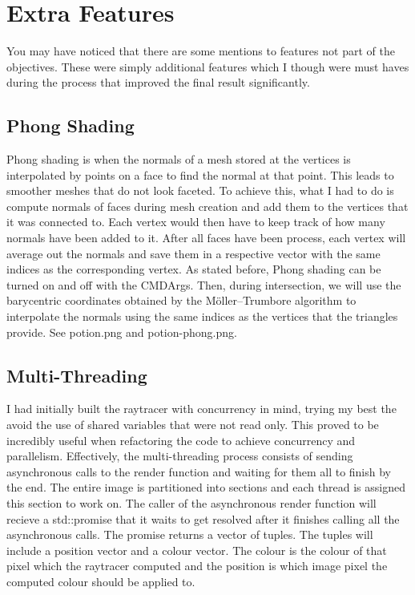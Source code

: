 \documentclass {article}
\begin{document}
\section{Extra Features}
You may have noticed that there are some mentions to features not part of the objectives. These 
were simply additional features which I though were must haves during the process that improved the
final result significantly.
\subsection{Phong Shading}
Phong shading is when the normals of a mesh stored at the vertices is interpolated by points on 
a face to find the normal at that point. This leads to smoother meshes that do not look faceted.
To achieve this, what I had to do is compute normals of faces during mesh creation and add them to 
the vertices that it was connected to. Each vertex would then have to keep track of how many normals have
been added to it. After all faces have been process, each vertex will average out the normals and 
save them in a respective vector with the same indices as the corresponding vertex.
 As stated before, Phong shading can be turned on
and off with the CMDArgs. Then, during intersection, we will use the barycentric coordinates obtained by
the Möller–Trumbore algorithm to interpolate the normals using the same indices as the vertices that the
triangles provide. See potion.png and potion-phong.png.
\subsection{Multi-Threading}
I had initially built the raytracer with concurrency in mind, trying my best the avoid 
the use of shared variables that were not read only. This proved to be incredibly useful 
when refactoring the code to achieve concurrency and parallelism. Effectively, the multi-threading process
consists of sending asynchronous calls to the render function and waiting for them all to finish
by the end. The entire image is partitioned into sections and each thread is assigned this section to work on.
The caller of the asynchronous render function will recieve a std::promise that it waits to get resolved after
it finishes calling all the asynchronous calls. The promise returns a vector of tuples. The tuples will include a
position vector and a colour vector. The colour is the colour of that pixel which the raytracer
computed and the position is which image pixel the computed colour should be applied to.
\end{document}
